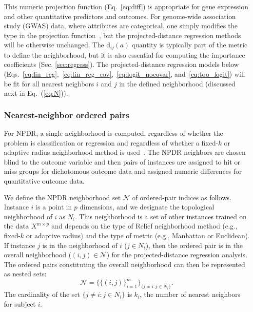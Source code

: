 \documentclass{bioinfo}
\begin{document}
This numeric projection function (Eq.~\ref{eq:diff}) is appropriate for gene expression and other quantitative predictors and outcomes.
For genome-wide association study (GWAS) data, where attributes are categorical, one simply modifies the type in the projection function~\citep{titv}, but the projected-distance regression methods will be otherwise unchanged.
The $\text{d}_{ij}(a)$ quantity is typically part of the metric to define the neighborhood, but it is also essential for computing the importance coefficients (Sec. \ref{sec:regress}).
The projected-distance regression models below (Eqs.~\ref{eq:lin_reg},~\ref{eq:lin_reg_cov},~\ref{eq:logit_nocovar}, and~\ref{eq:too_logit}) will be fit for all nearest neighbors $i$ and $j$ in the defined neighborhood (discussed next in Eq.~(\ref{eq:N})).

\subsubsection{Nearest-neighbor ordered pairs}
For NPDR, a single neighborhood is computed, regardless of whether the problem is classification or regression and regardless of whether a fixed-$k$ or adaptive radius neighborhood method is used~\citep{greene09,urbanowicz17,mckinney13}.
The NPDR neighbors are chosen blind to the outcome variable and then pairs of instances are assigned to hit or miss groups for dichotomous outcome data and assigned numeric differences for quantitative outcome data.

We define the NPDR neighborhood set $\mathcal{N}$ of ordered-pair indices as follows.
Instance $i$ is a point in $p$ dimensions, and we designate the topological neighborhood of $i$ as $N_{i}$.
This neighborhood is a set of other instances trained on the data $X^{m \times p}$ and depends on the type of Relief neighborhood method (e.g., fixed-$k$ or adaptive radius) and the type of metric (e.g., Manhattan or Euclidean).
If instance $j$ is in the neighborhood of $i$ ($j \in N_{i}$), then the ordered pair is in the overall neighborhood ($(i,j) \in \mathcal{N}$) for the projected-distance regression analysis.
The ordered pairs constituting the overall neighborhood can then be represented as nested sets:
\begin{equation}\label{eq:N}
\mathcal{N}=\{\{(i, j)\}_{i=1}^{m}\}_{\{j \ne i : j \in N_{i}\}}.
\end{equation}
The cardinality of the set $\{j \ne i : j \in N_{i}\}$ is $k_i$, the number of nearest neighbors for subject $i$.
\end{document}
